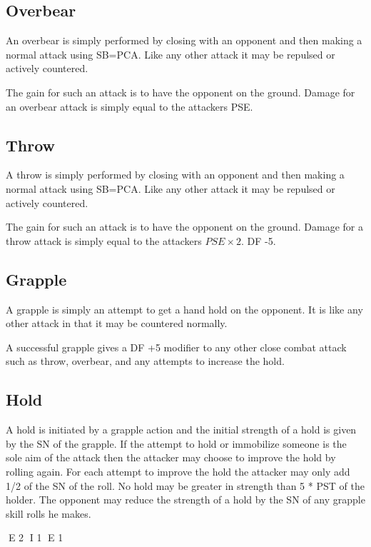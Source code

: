 \subsection{Overbear}

An overbear is simply performed by closing with an opponent and then
making a normal attack using SB=PCA. Like any other attack it may be
repulsed or actively countered.

The gain for such an attack is to have the opponent on the ground.
Damage for an overbear attack is simply equal to the attackers PSE.

\subsection{Throw}

A throw is simply performed by closing with an opponent and then
making a normal attack using SB=PCA. Like any other attack it may be
repulsed or actively countered.

The gain for such an attack is to have the opponent on the ground.
Damage for a throw attack is simply equal to the attackers \( PSE \times 2\).
DF -5.

\subsection{Grapple}

A grapple is simply an attempt to get a hand hold on the opponent.
It is like any other attack in that it may be countered normally.

A successful grapple gives a DF +5 modifier to any other close combat
attack such as throw, overbear, and any attempts to increase the hold.

\subsection{Hold}

A hold is initiated by a grapple action and the initial strength of a
hold is given by the SN of the grapple. If the attempt to hold or
immobilize someone is the sole aim of the attack then the attacker
may choose to improve the hold by rolling again. For each attempt to
improve the hold the attacker may only add 1/2 of the SN of the roll.
No hold may be greater in strength than 5 * PST of the holder.
The opponent may reduce the strength of a hold by the SN of any
grapple skill rolls he makes.

E 2
I 1
E 1
